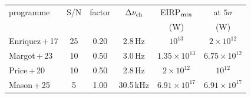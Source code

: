 \begin{tabular}{@{}lccccc@{}}
\toprule
programme & S/N & factor & $\Delta\nu_{\rm ch}$ & EIRP$_{\rm min}$ & at $5\sigma$ \\
 & & & & (W) & (W) \\
\midrule
Enriquez\,+\,17 & 25 & 0.20 & 2.8\,Hz & $10^{13}$ & $2\times10^{12}$ \\
Margot\,+\,23 & 10 & 0.50 & 3.0\,Hz & $1.35\times10^{13}$ & $6.75\times10^{12}$ \\
Price\,+\,20 & 10 & 0.50 & 2.8\,Hz & $2\times10^{12}$ & $10^{12}$ \\
Mason\,+\,25 & 5 & 1.00 & 30.5\,kHz & $6.91\times10^{17}$ & $6.91\times10^{17}$ \\
\bottomrule
\end{tabular}
